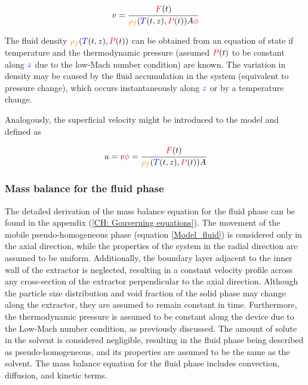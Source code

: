 \documentclass[../Article_Model_Parameters.tex]{subfiles}
\begin{document}
	{\footnotesize
	\begin{equation}
		v = \cfrac{{\color{red}F}(t)}{{\color{orange}\rho_f}({\color{blue}T}(t,z),{\color{red}P}(t)) A {\color{magenta}\phi}} 
	\end{equation}
	}
	
	The fluid density ${\color{orange}\rho_f}({\color{blue}T}(t,z),{\color{red}P}(t))$ can be obtained from an equation of state if temperature and the thermodynamic pressure (assumed ${\color{red}P}(t)$ to be constant along ${\color{blue}z}$ due to the low-Mach number condition) are known. The variation in density may be caused by the fluid accumulation in the system (equivalent to pressure change), which occurs instantaneously along ${\color{blue}z}$ or by a temperature change. 
	
	Analogously, the superficial velocity might be introduced to the model and defined as
	
	{\footnotesize
		\begin{equation}
			u = v {\color{magenta}\phi} = \cfrac{{\color{red}F}(t)}{{\color{orange}\rho_f}({\color{blue}T}(t,z),{\color{red}P}(t)) A }
		\end{equation}
	}
	
	\subsubsection{Mass balance for the fluid phase} \label{CH: Mass_balance_fluid}
	
	The detailed derivation of the mass balance equation for the fluid phase can be found in the appendix (\ref{CH: Gouverning equations}). The movement of the mobile pseudo-homogeneous phase (equation \ref{Model_fluid}) is considered only in the axial direction, while the properties of the system in the radial direction are assumed to be uniform. Additionally, the boundary layer adjacent to the inner wall of the extractor is neglected, resulting in a constant velocity profile across any cross-section of the extractor perpendicular to the axial direction. Although the particle size distribution and void fraction of the solid phase may change along the extractor, they are assumed to remain constant in time. Furthermore, the thermodynamic pressure is assumed to be constant along the device due to the Low-Mach number condition, as previously discussed. The amount of solute in the solvent is considered negligible, resulting in the fluid phase being described as pseudo-homogeneous, and its properties are assumed to be the same as the solvent. The mass balance equation for the fluid phase includes convection, diffusion, and kinetic terms.
	
\end{document}

